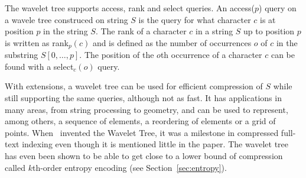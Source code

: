 The wavelet tree supports access, rank and select queries.
An access($p$) query on a wavele tree construced on string $S$ is the query for what character $c$ is at position $p$ in the string $S$.
The rank of a character $c$ in a string $S$ up to position $p$ is written as rank$_{p}(c)$ and is defined as the number of occurrences $o$ of $c$ in the substring $S[0, \ldots, p]$.
The position of the $o$th occurrence of a character $c$ can be found with a select$_c(o)$ query.

With extensions, a wavelet tree can be used for efficient compression of $S$ while still supporting the same queries, although not as fast.
It has applications in many areas, from string processing to geometry, and can be used to represent, among others, a sequence of elements, a reordering of elements or a grid of points. 
When~ invented the Wavelet Tree, it was a milestone in compressed full-text indexing even though it is mentioned little in the paper.
The wavelet tree has even been shown to be able to get close to a lower bound of compression called $k$th-order entropy encoding (see Section~\ref{sec:entropy}).